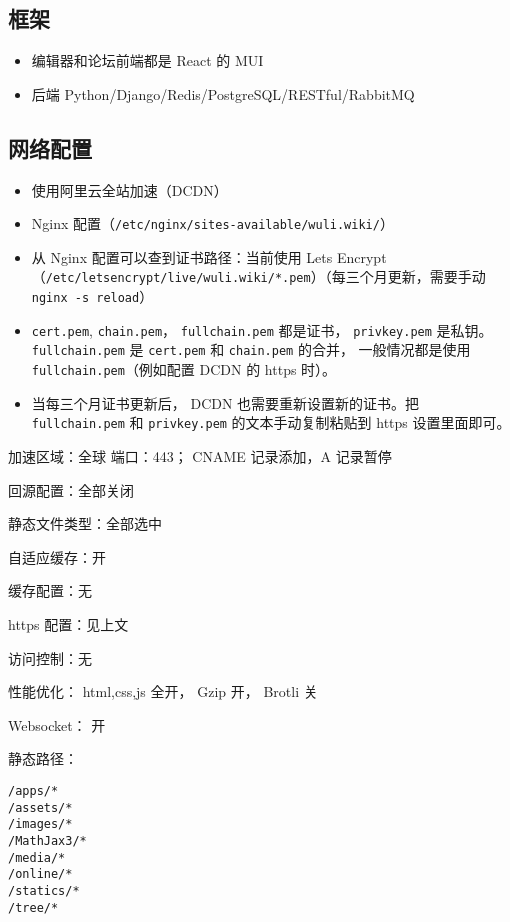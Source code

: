 \subsection{框架}
\begin{itemize}
\item 编辑器和论坛前端都是 React 的 MUI
\item 后端 Python/Django/Redis/PostgreSQL/RESTful/RabbitMQ
\end{itemize}

\subsection{网络配置}
\begin{itemize}
\item 使用阿里云全站加速（DCDN）
\item Nginx 配置（\verb`/etc/nginx/sites-available/wuli.wiki/`）
\item 从 Nginx 配置可以查到证书路径：当前使用 Lets Encrypt （\verb`/etc/letsencrypt/live/wuli.wiki/*.pem`）（每三个月更新，需要手动 \verb`nginx -s reload`）
\item \verb`cert.pem`, \verb`chain.pem`， \verb`fullchain.pem` 都是证书， \verb`privkey.pem` 是私钥。 \verb`fullchain.pem` 是 \verb`cert.pem` 和 \verb`chain.pem` 的合并， 一般情况都是使用 \verb`fullchain.pem`（例如配置 DCDN 的 https 时）。
\item 当每三个月证书更新后， DCDN 也需要重新设置新的证书。把 \verb`fullchain.pem` 和 \verb`privkey.pem` 的文本手动复制粘贴到 https 设置里面即可。
\end{itemize}

加速区域：全球 端口：443； CNAME 记录添加，A 记录暂停

回源配置：全部关闭

静态文件类型：全部选中

自适应缓存：开

缓存配置：无

https 配置：见上文

访问控制：无

性能优化： html,css,js 全开， Gzip 开， Brotli 关

Websocket： 开

静态路径：
\begin{lstlisting}[language=none]
/apps/*
/assets/*
/images/*
/MathJax3/*
/media/*
/online/*
/statics/*
/tree/*
\end{lstlisting}